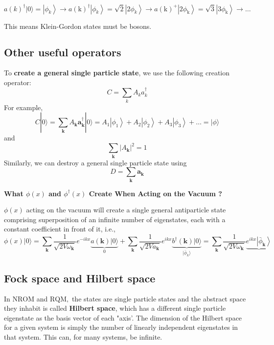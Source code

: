 $$
a(k)^{\dagger}|0\rangle=\left|\phi_{k}\right\rangle\rightarrow a(\mathrm{k})^{\dagger}\left|\phi_{k}\right\rangle=\sqrt{2}\left|2 \phi_{k}\right\rangle\rightarrow a(\mathrm{k})^{+}\left|2 \phi_{\mathrm{k}}\right\rangle=\sqrt{3}\left|3 \phi_{\mathrm{k}}\right\rangle \rightarrow\dots
$$

This means Klein-Gordon states must be bosons.

\subsection{Other useful operators}
To \textbf{create a general single particle state}, we use the following creation operator:
\begin{equation}
C=\sum_{k} A_{k} a_{k}^{\dagger}
\end{equation}
For example,
$$
C|0\rangle=\sum_{\mathbf{k}} A_{\mathbf{k}} \mathbf{a}_{\mathbf{k}}^{\dagger}|0\rangle= A_{1}\left|\phi_{1}\right\rangle+ A_{2}\left|\phi_{2}\right\rangle+ A_{3}\left|\phi_{3}\right\rangle+\ldots=|\phi\rangle
$$
and
$$
\sum_{\mathbf{k}}\left|A_{\mathbf{k}}\right|^{2}=1
$$
Similarly, we can destroy a general single particle state using
\begin{equation}
D=\sum_{\mathbf{k}} \mathbf{a}_{\mathbf{k}}
\end{equation}
\begin{mybox}
\textbf{What $\phi(x)$ and $\phi^{\dagger}(x)$ Create When Acting on the Vacuum ?}

$\phi(x)$ acting on the vacuum will create a single general antiparticle state comprising superposition of an infinite number of eigenstates, each with a constant coefficient in front of it, i.e.,
$$
\phi(x)|0\rangle=\sum_{\mathbf{k}} \frac{1}{\sqrt{2 V \omega_{\mathbf{k}}}} e^{-i k x} \underbrace{a(\mathbf{k})|0\rangle}_{0}+\sum_{\mathbf{k}} \frac{1}{\sqrt{2 V a_{\mathbf{k}}}} e^{i k x} \underbrace{b^{\dagger}(\mathbf{k})|0\rangle}_{|\bar{\phi}_k\rangle}=\sum_{\mathbf{k}} \frac{1}{\sqrt{2 V \omega_{\mathbf{k}}}} \underbrace{e^{i k x}\left|\bar{\phi}_{\mathbf{k}}\right\rangle}
$$
\end{mybox}
\subsection{Fock space and Hilbert space}
In $\mathrm{NROM}$ and $\mathrm{RQM},$ the states are single particle states and the abstract space they inhabit is called \textbf{Hilbert space}, which has a different single particle eigenstate as the basis vector of each "axis'. The dimension of the Hilbert space for a given system is simply the number of linearly independent eigenstates in that system. This can, for many systems, be infinite.

